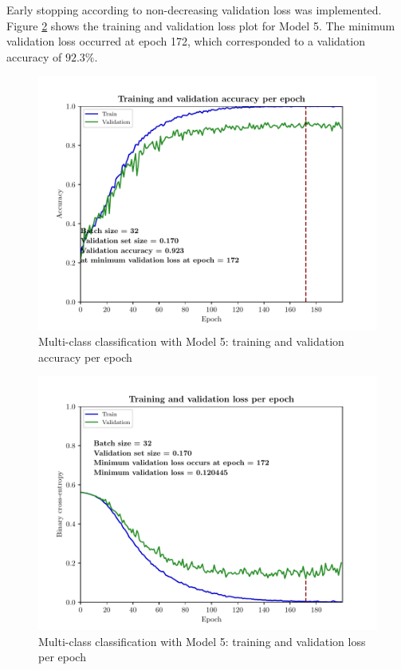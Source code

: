 \documentclass[conference]{IEEEtran}
\begin{document}
Early stopping according to non-decreasing validation loss was implemented.
Figure \ref{fig:multi:loss} shows the training and validation loss plot for Model 5. The minimum validation loss occurred at epoch 172, which corresponded to a validation accuracy of $92.3\%$. 

\begin{figure}[ht]
    \centering
    \includegraphics[scale=0.48]{main_24_multiclass_00_accuracy.pdf}
    \caption{Multi-class classification with Model 5: training and validation accuracy per epoch}
    \label{fig:multi:acc}
\end{figure}

\begin{figure}[ht]
    \centering
    \includegraphics[scale=0.48]{main_24_multiclass_00_loss.pdf}
    \caption{Multi-class classification with Model 5: training and validation loss per epoch}
    \label{fig:multi:loss}
\end{figure}
\end{document}
